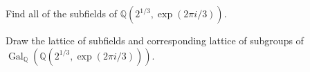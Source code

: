 \documentclass{article}
\begin{document}
\begin{subexercise} \label{qs:5a} %
Find all of the subfields of \( \mathbb{Q}(2^{1/3}, \exp(2\pi i / 3)) \).
\end{subexercise}
\begin{solution}

\end{solution}
\pagebreak

\begin{subexercise} \label{qs:fiveb} %
Draw the lattice of subfields and corresponding lattice of subgroups of \\
\( \operatorname{Gal}_{\mathbb{Q}}(\mathbb{Q}(2^{1/3}, \exp({2\pi i / 3}))) \).
\end{subexercise}
\begin{solution}

\end{solution}
\pagebreak
\end{document}
